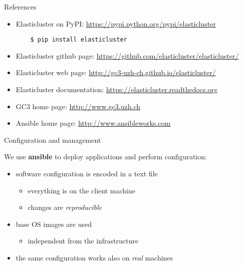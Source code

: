 \documentclass[english,serif,mathserif,usenames,dvipsnames]{beamer}
\begin{document}
\begin{frame}[fragile]
  {References}
  \begin{itemize}
  \item Elasticluster on PyPI:
    \url{https://pypi.python.org/pypi/elasticluster}

\begin{verbatim}
    $ pip install elasticluster
\end{verbatim}

  \item Elasticluster github page: 
    \url{https://github.com/elasticluster/elasticluster/}
  \item Elasticluster web page: 
    \url{http://gc3-uzh-ch.github.io/elasticluster/}
  \item Elasticluster documentation:
    \url{https://elasticluster.readthedocs.org}
  \item GC3 home page: \url{http://www.gc3.uzh.ch}
  \item Ansible home page: \url{http://www.ansibleworks.com}
  \end{itemize}
\end{frame}

\begin{frame}
  {Configuration and management}

  We use \textbf{ansible} to deploy applications and perform
  configuration:
  \begin{itemize}
  \item software configuration is encoded in a text file
    \begin{itemize}
    \item everything is on the client machine
    \item changes are \textit{reproducible} 
    \end{itemize}
  \item base OS images are used
    \begin{itemize}
    \item independent from the infrastructure
    \end{itemize}
  \item the same configuration works also on \textit{real} machines
  \end{itemize}

\end{frame}
\end{document}
